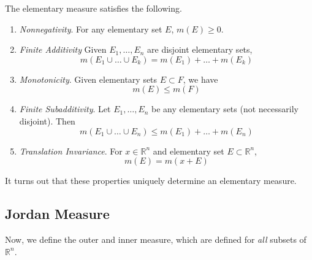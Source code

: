  \begin{lemma}
    The elementary measure satisfies the following. 
    \begin{enumerate}
      \item \textit{Nonnegativity}. For any elementary set $E$, $m(E) \geq 0$. 
      \item \textit{Finite Additivity} Given $E_1, \ldots, E_n$ are disjoint elementary sets, 
      \begin{equation}
        m(E_1 \cup \ldots \cup E_k) = m(E_1) + \ldots + m(E_k)
      \end{equation}

      \item \textit{Monotonicity}. Given elementary sets $E \subset F$, we have 
      \begin{equation}
        m(E) \leq m(F)
      \end{equation}

      \item \textit{Finite Subadditivity}. Let $E_1, \ldots, E_n$ be any elementary sets (not necessarily disjoint). Then 
      \begin{equation}
        m(E_1 \cup \ldots \cup E_n) \leq m(E_1) + \ldots + m(E_n)
      \end{equation}

      \item \textit{Translation Invariance}. For $x \in \mathbb{R}^n$ and elementary set $E \subset \mathbb{R}^n$, 
      \begin{equation}
        m(E) = m(x + E) 
      \end{equation}
    \end{enumerate}
  \end{lemma}

  It turns out that these properties uniquely determine an elementary measure. 

  \begin{theorem}
    
  \end{theorem}

\subsection{Jordan Measure}

  Now, we define the outer and inner measure, which are defined for \textit{all} subsets of $\mathbb{R}^n$. 

